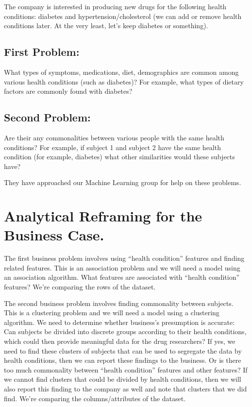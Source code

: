 The company is interested in producing new drugs for the following
health conditions: diabetes and hypertension/cholesterol (we can add or
remove health conditions later. At the very least, let's keep diabetes
or something).

\hypertarget{first-problem}{%
\subsection{First Problem:}\label{first-problem}}

What types of symptoms, medications, diet, demographics are common among
various health conditions (such as diabetes)? For example, what types of
dietary factors are commonly found with diabetes?

\hypertarget{second-problem}{%
\subsection{Second Problem:}\label{second-problem}}

Are their any commonalities between various people with the same health
conditions? For example, if subject 1 and subject 2 have the same health
condition (for example, diabetes) what other similarities would these
subjects have?

They have approached our Machine Learning group for help on these
problems.

\hypertarget{analytical-reframing-for-the-business-case.}{%
\section{Analytical Reframing for the Business
Case.}\label{analytical-reframing-for-the-business-case.}}

The first business problem involves using ``health condition'' features
and finding related features. This is an association problem and we will
need a model using an association algorithm. What features are
associated with ``health condition'' features? We're comparing the rows
of the dataset.

The second business problem involves finding commonality between
subjects. This is a clustering problem and we will need a model using a
clustering algorithm. We need to determine whether business's
presumption is accurate: Can subjects be divided into discrete groups
according to their health conditions, which could then provide
meaningful data for the drug researchers? If yes, we need to find these
clusters of subjects that can be used to segregate the data by health
conditions, then we can report these findings to the business. Or is
there too much commonality between ``health condition'' features and
other features? If we cannot find clusters that could be divided by
health conditions, then we will also report this finding to the company
as well and note that clusters that we did find. We're comparing the
columns/attributes of the dataset.

